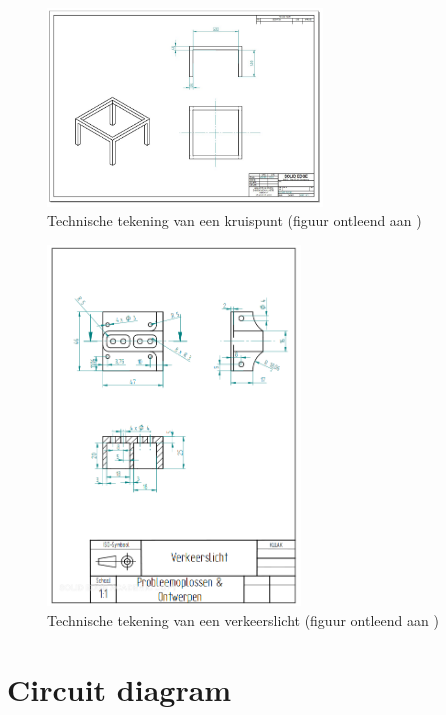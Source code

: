 \documentclass[a4paper,kulak]{kulakarticle}
\begin{document}
\begin{appendices}
\begin{figure}[h]
	\centering
	\includegraphics[width=0.65\textwidth]{tafelstel.png}
	\caption{Technische tekening van een kruispunt (figuur ontleend aan \cite{opgave})}
	\label{techtekkruispunt}
\end{figure}

\begin{figure}[h]
	\centering
	\includegraphics[width=0.6\textwidth]{verkeerslicht.png}
	\caption{Technische tekening van een verkeerslicht (figuur ontleend aan \cite{opgave} )}
	\label{verkeerslicht}
\end{figure}

\section{Circuit diagram}




\end{appendices}
\end{document}

